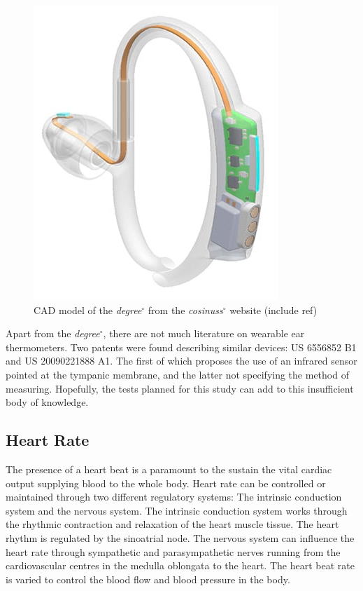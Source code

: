 \begin{figure}
   \centering
   \includegraphics[scale=0.65]{figs/Degree}
   \caption{CAD model of the \textit{degree}$^{\circ}$ from the \textit{cosinuss}$^{\circ}$ website (include ref)}
   \label{fig:Degree}
\end{figure}

Apart from the \textit{degree}$^{\circ}$, there are not much literature on wearable ear thermometers. Two patents were found describing similar devices: US 6556852 B1 and US 20090221888 A1. The first of which proposes the use of an infrared sensor pointed at the tympanic membrane, and the latter not specifying the method of measuring. Hopefully, the tests planned for this study can add to this insufficient body of knowledge.

\subsection{Heart Rate}
The presence of a heart beat is a paramount to the sustain the vital cardiac output supplying blood to the whole body. Heart  rate can be controlled or maintained through two different regulatory systems: The intrinsic conduction system and the nervous system. The intrinsic conduction system works through the rhythmic contraction and relaxation of the heart muscle tissue. The heart rhythm is regulated by the sinoatrial node. The nervous system can influence the heart rate through sympathetic and parasympathetic nerves running from the cardiovascular centres in the medulla oblongata to the heart. The heart beat rate is varied to control the blood flow and blood pressure in the body.

